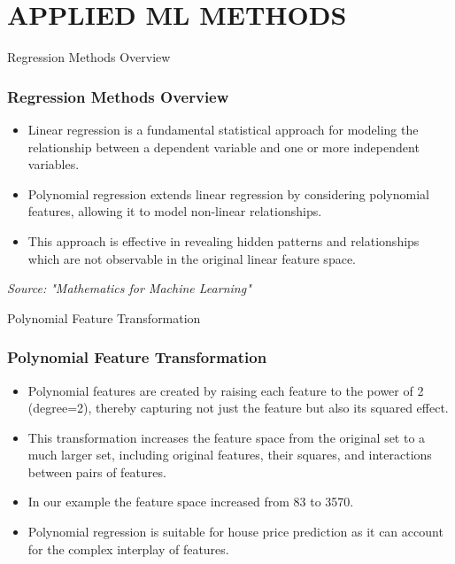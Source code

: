 \section{APPLIED ML METHODS}
\label{applied_ml_methods}


\begin{frame}{Regression Methods Overview}
    \frametitle{Regression Methods Overview}
    \begin{itemize}
        \item Linear regression is a fundamental statistical approach for modeling the relationship between a dependent variable and one or more independent variables.
        \item Polynomial regression extends linear regression by considering polynomial features, allowing it to model non-linear relationships.
        \item This approach is effective in revealing hidden patterns and relationships which are not observable in the original linear feature space.
    \end{itemize}
    \vspace{0.5cm}
    \center
    \tiny
    \textit{Source: "Mathematics for Machine Learning" \cite{deisenroth2020mathematics}}
\end{frame}

\begin{frame}{Polynomial Feature Transformation}
    \frametitle{Polynomial Feature Transformation}
    \begin{itemize}
        \item Polynomial features are created by raising each feature to the power of 2 (degree=2), thereby capturing not just the feature but also its squared effect.
        \item This transformation increases the feature space from the original set to a much larger set, including original features, their squares, and interactions between pairs of features.
        \item In our example the feature space increased from 83 to 3570.
        \item Polynomial regression is suitable for house price prediction as it can account for the complex interplay of features.
    \end{itemize}
\end{frame}

